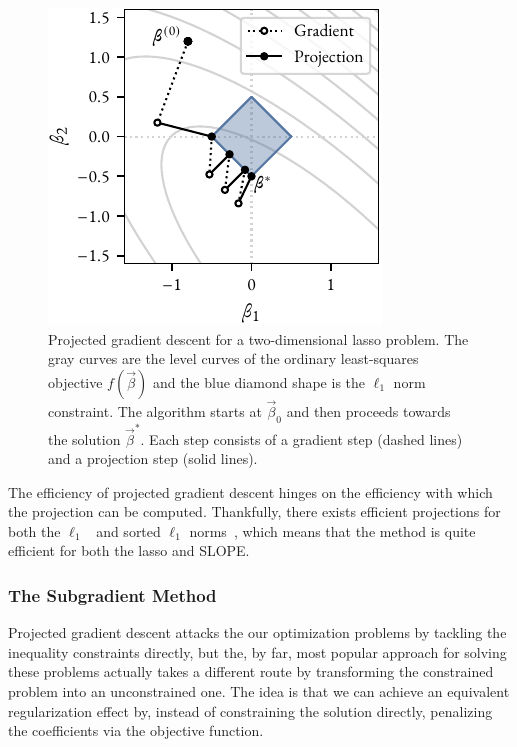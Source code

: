 \begin{figure}[htpb]
  \centering
  \includegraphics[]{figures/proj-gradient-2d.pdf}
  \caption{%
    Projected gradient descent for a two-dimensional lasso problem. The gray curves are the level curves of the ordinary least-squares objective \(f(\vec{\beta})\) and the blue diamond shape is the \(\ell_1\) norm constraint. The algorithm starts at \(\vec{\beta}_0\) and then proceeds towards the solution \(\vec{\beta}^*\). Each step consists of a gradient step (dashed lines) and a projection step (solid lines).
  }
  \label{fig:projected-gradient-descent}
\end{figure}


The efficiency of projected gradient descent hinges on the efficiency with which the projection can be computed. Thankfully, there exists efficient projections for both the \(\ell_1\)~\parencite{duchi2008} and sorted \(\ell_1\) norms~\parencite{zeng2015,li2021,perez2022,davis2015}, which means that the method is quite efficient for both the lasso and SLOPE.


\subsubsection{The Subgradient Method}

Projected gradient descent attacks the our optimization problems by tackling the inequality constraints directly, but the, by far, most popular approach for solving these problems actually takes a different route by transforming the constrained problem into an unconstrained one. The idea is that we can achieve an equivalent regularization effect by, instead of constraining the solution directly, penalizing the coefficients via the objective function.


